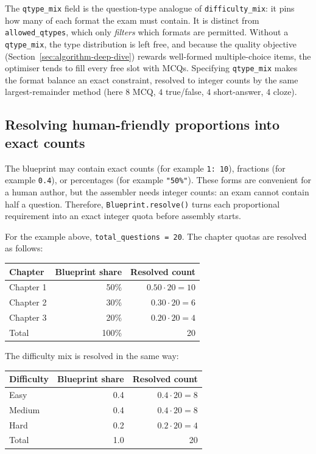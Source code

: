 \documentclass[11pt,a4paper]{article}
\newcommand{\code}[1]{\texttt{\small #1}}
\begin{document}
The \code{qtype\_mix} field is the question-type analogue of
\code{difficulty\_mix}: it pins how many of each format the exam must contain.
It is distinct from \code{allowed\_qtypes}, which only \emph{filters} which
formats are permitted. Without a \code{qtype\_mix}, the type distribution is
left free, and because the quality objective (Section~\ref{sec:algorithm-deep-dive})
rewards well-formed multiple-choice items, the optimiser tends to fill every
free slot with MCQs. Specifying \code{qtype\_mix} makes the format balance an
exact constraint, resolved to integer counts by the same largest-remainder
method (here $8$ MCQ, $4$ true/false, $4$ short-answer, $4$ cloze).

\subsection{Resolving human-friendly proportions into exact counts}

The blueprint may contain exact counts (for example \code{1: 10}), fractions
(for example \code{0.4}), or percentages (for example \code{"50\%"}). These
forms are convenient for a human author, but the assembler needs integer counts:
an exam cannot contain half a question. Therefore, \code{Blueprint.resolve()}
turns each proportional requirement into an exact integer quota before assembly
starts.

For the example above, \code{total\_questions = 20}. The chapter quotas are
resolved as follows:

\begin{center}
\begin{tabular}{@{}lrr@{}}
\toprule
\textbf{Chapter} & \textbf{Blueprint share} & \textbf{Resolved count} \\
\midrule
Chapter 1 & 50\% & $0.50 \cdot 20 = 10$ \\
Chapter 2 & 30\% & $0.30 \cdot 20 = 6$ \\
Chapter 3 & 20\% & $0.20 \cdot 20 = 4$ \\
\midrule
Total & 100\% & 20 \\
\bottomrule
\end{tabular}
\end{center}

The difficulty mix is resolved in the same way:

\begin{center}
\begin{tabular}{@{}lrr@{}}
\toprule
\textbf{Difficulty} & \textbf{Blueprint share} & \textbf{Resolved count} \\
\midrule
Easy   & 0.4 & $0.4 \cdot 20 = 8$ \\
Medium & 0.4 & $0.4 \cdot 20 = 8$ \\
Hard   & 0.2 & $0.2 \cdot 20 = 4$ \\
\midrule
Total & 1.0 & 20 \\
\bottomrule
\end{tabular}
\end{center}
\end{document}
